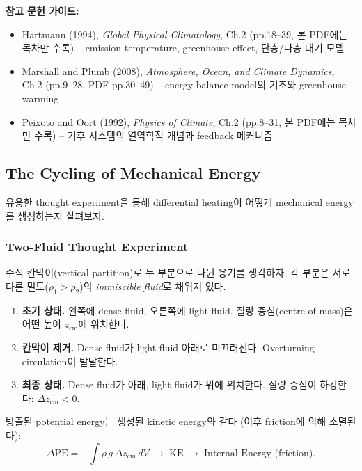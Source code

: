 \begin{hisublock}
\textbf{참고 문헌 가이드:}
\begin{itemize}
  \item Hartmann (1994), \textit{Global Physical Climatology}, Ch.2 (pp.18--39, 본 PDF에는 목차만 수록) -- emission temperature, greenhouse effect, 단층/다층 대기 모델
  \item Marshall and Plumb (2008), \textit{Atmosphere, Ocean, and Climate Dynamics}, Ch.2 (pp.9--28, PDF pp.30--49) -- energy balance model의 기초와 greenhouse warming
  \item Peixoto and Oort (1992), \textit{Physics of Climate}, Ch.2 (pp.8--31, 본 PDF에는 목차만 수록) -- 기후 시스템의 열역학적 개념과 feedback 메커니즘
\end{itemize}
\end{hisublock}

\subsection{The Cycling of Mechanical Energy}\label{subsec:cycling}

유용한 thought experiment을 통해 differential heating이 어떻게
mechanical energy를 생성하는지 살펴보자.

\subsubsection{Two-Fluid Thought Experiment}

수직 칸막이(vertical partition)로 두 부분으로 나뉜 용기를 생각하자. 각 부분은
서로 다른 밀도($\rho_1 > \rho_2$)의 \emph{immiscible fluid}로 채워져 있다.

\begin{enumerate}
  \item \textbf{초기 상태.}  왼쪽에 dense fluid, 오른쪽에 light fluid.
    질량 중심(centre of mass)은 어떤 높이 $z_{\mathrm{cm}}$에 위치한다.
  \item \textbf{칸막이 제거.}  Dense fluid가 light fluid 아래로 미끄러진다.
    Overturning circulation이 발달한다.
  \item \textbf{최종 상태.}  Dense fluid가 아래, light fluid가 위에 위치한다.
    질량 중심이 하강한다: $\Delta z_{\mathrm{cm}} < 0$.
\end{enumerate}

방출된 potential energy는 생성된 kinetic energy와 같다
(이후 friction에 의해 소멸된다):
\begin{equation}\label{eq:two-fluid}
  \Delta \mathrm{PE} = -\int \rho\, g\, \Delta z_{\mathrm{cm}} \, dV
  \;\longrightarrow\; \mathrm{KE} \;\longrightarrow\; \text{Internal Energy (friction)}.
\end{equation}

